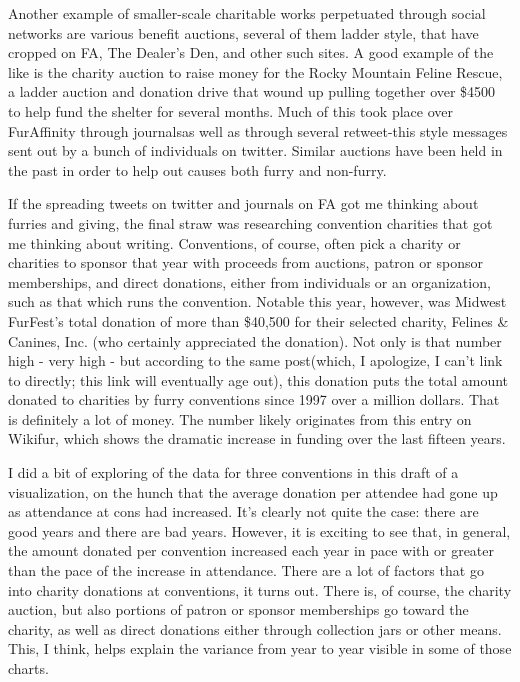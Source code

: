 Another example of smaller-scale charitable works perpetuated through social networks are various benefit auctions, several of them ladder style, that have cropped on FA, The Dealer's Den, and other such sites. A good example of the like is the charity auction to raise money for the Rocky Mountain Feline Rescue, a ladder auction and donation drive that wound up pulling together over \$4500 to help fund the shelter for several months. Much of this took place over FurAffinity through journalsas well as through several retweet-this style messages sent out by a bunch of individuals on twitter. Similar auctions have been held in the past in order to help out causes both furry and non-furry.

If the spreading tweets on twitter and journals on FA got me thinking about furries and giving, the final straw was researching convention charities that got me thinking about writing. Conventions, of course, often pick a charity or charities to sponsor that year with proceeds from auctions, patron or sponsor memberships, and direct donations, either from individuals or an organization, such as that which runs the convention. Notable this year, however, was Midwest FurFest's total donation of more than \$40,500 for their selected charity, Felines \& Canines, Inc. (who certainly appreciated the donation). Not only is that number high - very high - but according to the same post(which, I apologize, I can't link to directly; this link will eventually age out), this donation puts the total amount donated to charities by furry conventions since 1997 over a million dollars. That is definitely a lot of money. The number likely originates from this entry on Wikifur, which shows the dramatic increase in funding over the last fifteen years.

I did a bit of exploring of the data for three conventions in this draft of a visualization, on the hunch that the average donation per attendee had gone up as attendance at cons had increased. It's clearly not quite the case: there are good years and there are bad years. However, it is exciting to see that, in general, the amount donated per convention increased each year in pace with or greater than the pace of the increase in attendance. There are a lot of factors that go into charity donations at conventions, it turns out. There is, of course, the charity auction, but also portions of patron or sponsor memberships go toward the charity, as well as direct donations either through collection jars or other means. This, I think, helps explain the variance from year to year visible in some of those charts.

